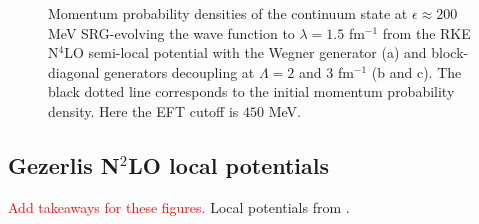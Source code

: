 \documentclass[preprintnumbers,floatfix,aps,prc,preprint,nofootinbib]{revtex4-1}
\begin{document}
\begin{figure}[H]
	\centering
	\quad
	\quad
	\caption{Momentum probability densities of the continuum state at $\epsilon \approx 200$ MeV SRG-evolving the wave function to $\lambda=1.5$ fm$^{-1}$ from the RKE N$^4$LO semi-local potential with the Wegner generator (a) and block-diagonal generators decoupling at $\Lambda=2$ and $3$ fm$^{-1}$ (b and c). The black dotted line corresponds to the initial momentum probability density. Here the EFT cutoff is $450$ MeV.}
	\label{continuum_state_momentum_distribution_eps200,0_kvnn111}
\end{figure}


\subsection{Gezerlis N$^2$LO local potentials}
\label{sec:local_results}


\textcolor{red}{Add takeaways for these figures.} Local potentials from \cite{Gezerlis:2014zia}.
\end{document}
